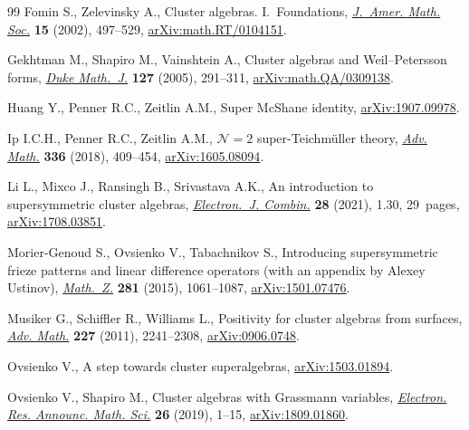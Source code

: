 \documentclass[pdftex]{sigma}
\numberwithin{equation}{section}
\begin{document}
\begin{thebibliography}{99}
Fomin S., Zelevinsky A., Cluster algebras. {I}.~{F}oundations, \href{https://doi.org/10.1090/S0894-0347-01-00385-X}{\textit{J.~Amer.
 Math. Soc.}} \textbf{15} (2002), 497--529, \href{https://arxiv.org/abs/math.RT/0104151}{arXiv:math.RT/0104151}.

Gekhtman M., Shapiro M., Vainshtein A., Cluster algebras and
 {W}eil--{P}etersson forms, \href{https://doi.org/10.1215/S0012-7094-04-12723-X}{\textit{Duke Math.~J.}} \textbf{127} (2005),
 291--311, \href{https://arxiv.org/abs/math.QA/0309138}{arXiv:math.QA/0309138}.

Huang Y., Penner R.C., Zeitlin A.M., Super {M}c{S}hane identity,
 \href{https://arxiv.org/abs/1907.09978}{arXiv:1907.09978}.

Ip I.C.H., Penner R.C., Zeitlin A.M., {$\mathcal{N}=2$} super-{T}eichm\"uller
 theory, \href{https://doi.org/10.1016/j.aim.2018.08.001}{\textit{Adv. Math.}} \textbf{336} (2018), 409--454,
 \href{https://arxiv.org/abs/1605.08094}{arXiv:1605.08094}.

Li L., Mixco J., Ransingh B., Srivastava A.K., An introduction to
 supersymmetric cluster algebras, \href{https://doi.org/10.37236/9442}{\textit{Electron.~J. Combin.}} \textbf{28}
 (2021), 1.30, 29~pages, \href{https://arxiv.org/abs/1708.03851}{arXiv:1708.03851}.

Morier-Genoud S., Ovsienko V., Tabachnikov S., Introducing supersymmetric
 frieze patterns and linear difference operators (with an appendix by {A}lexey
 {U}stinov), \href{https://doi.org/10.1007/s00209-015-1520-x}{\textit{Math.~Z.}} \textbf{281} (2015), 1061--1087,
 \href{https://arxiv.org/abs/1501.07476}{arXiv:1501.07476}.

Musiker G., Schiffler R., Williams L., Positivity for cluster algebras from
 surfaces, \href{https://doi.org/10.1016/j.aim.2011.04.018}{\textit{Adv. Math.}} \textbf{227} (2011), 2241--2308,
 \href{https://arxiv.org/abs/0906.0748}{arXiv:0906.0748}.

Ovsienko V., A step towards cluster superalgebras, \href{https://arxiv.org/abs/1503.01894}{arXiv:1503.01894}.

Ovsienko V., Shapiro M., Cluster algebras with {G}rassmann variables,
 \href{https://doi.org/10.3934/era.2019.26.001}{\textit{Electron. Res. Announc. Math. Sci.}} \textbf{26} (2019), 1--15,
 \href{https://arxiv.org/abs/1809.01860}{arXiv:1809.01860}.


\end{thebibliography}
\end{document}
